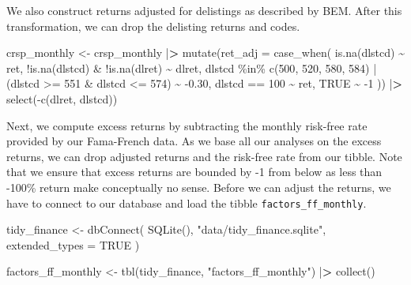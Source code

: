 \documentclass[
]{book}
\newenvironment{Shaded}{\begin{snugshade}}{\end{snugshade}}
\newcommand{\AttributeTok}[1]{\textcolor[rgb]{0.61,0.61,0.61}{#1}}
\newcommand{\ConstantTok}[1]{\textcolor[rgb]{0,0,0}{#1}}
\newcommand{\DecValTok}[1]{\textcolor[rgb]{0.06,0.06,0.06}{#1}}
\newcommand{\ErrorTok}[1]{\textcolor[rgb]{0.14,0.14,0.14}{\textbf{#1}}}
\newcommand{\FloatTok}[1]{\textcolor[rgb]{0.06,0.06,0.06}{#1}}
\newcommand{\FunctionTok}[1]{\textcolor[rgb]{0,0,0}{#1}}
\newcommand{\NormalTok}[1]{#1}
\newcommand{\OtherTok}[1]{\textcolor[rgb]{0.37,0.37,0.37}{#1}}
\newcommand{\SpecialCharTok}[1]{\textcolor[rgb]{0,0,0}{#1}}
\newcommand{\StringTok}[1]{\textcolor[rgb]{0.5,0.5,0.5}{#1}}
\begin{document}
We also construct returns adjusted for delistings as described by BEM. After this transformation, we can drop the delisting returns and codes.

\begin{Shaded}
\begin{Highlighting}[]
\NormalTok{crsp\_monthly }\OtherTok{\textless{}{-}}\NormalTok{ crsp\_monthly }\SpecialCharTok{|}\ErrorTok{\textgreater{}}
  \FunctionTok{mutate}\NormalTok{(}\AttributeTok{ret\_adj =} \FunctionTok{case\_when}\NormalTok{(}
    \FunctionTok{is.na}\NormalTok{(dlstcd) }\SpecialCharTok{\textasciitilde{}}\NormalTok{ ret,}
    \SpecialCharTok{!}\FunctionTok{is.na}\NormalTok{(dlstcd) }\SpecialCharTok{\&} \SpecialCharTok{!}\FunctionTok{is.na}\NormalTok{(dlret) }\SpecialCharTok{\textasciitilde{}}\NormalTok{ dlret,}
\NormalTok{    dlstcd }\SpecialCharTok{\%in\%} \FunctionTok{c}\NormalTok{(}\DecValTok{500}\NormalTok{, }\DecValTok{520}\NormalTok{, }\DecValTok{580}\NormalTok{, }\DecValTok{584}\NormalTok{) }\SpecialCharTok{|}
\NormalTok{      (dlstcd }\SpecialCharTok{\textgreater{}=} \DecValTok{551} \SpecialCharTok{\&}\NormalTok{ dlstcd }\SpecialCharTok{\textless{}=} \DecValTok{574}\NormalTok{) }\SpecialCharTok{\textasciitilde{}} \SpecialCharTok{{-}}\FloatTok{0.30}\NormalTok{,}
\NormalTok{    dlstcd }\SpecialCharTok{==} \DecValTok{100} \SpecialCharTok{\textasciitilde{}}\NormalTok{ ret,}
    \ConstantTok{TRUE} \SpecialCharTok{\textasciitilde{}} \SpecialCharTok{{-}}\DecValTok{1}
\NormalTok{  )) }\SpecialCharTok{|}\ErrorTok{\textgreater{}}
  \FunctionTok{select}\NormalTok{(}\SpecialCharTok{{-}}\FunctionTok{c}\NormalTok{(dlret, dlstcd))}
\end{Highlighting}
\end{Shaded}

Next, we compute excess returns by subtracting the monthly risk-free rate provided by our Fama-French data. As we base all our analyses on the excess returns, we can drop adjusted returns and the risk-free rate from our tibble. Note that we ensure that excess returns are bounded by -1 from below as less than -100\% return make conceptually no sense. Before we can adjust the returns, we have to connect to our database and load the tibble \texttt{factors\_ff\_monthly}.

\begin{Shaded}
\begin{Highlighting}[]
\NormalTok{tidy\_finance }\OtherTok{\textless{}{-}} \FunctionTok{dbConnect}\NormalTok{(}
  \FunctionTok{SQLite}\NormalTok{(), }\StringTok{"data/tidy\_finance.sqlite"}\NormalTok{, }\AttributeTok{extended\_types =} \ConstantTok{TRUE}
\NormalTok{)}

\NormalTok{factors\_ff\_monthly }\OtherTok{\textless{}{-}} \FunctionTok{tbl}\NormalTok{(tidy\_finance, }\StringTok{"factors\_ff\_monthly"}\NormalTok{) }\SpecialCharTok{|}\ErrorTok{\textgreater{}}
  \FunctionTok{collect}\NormalTok{()}
\end{Highlighting}
\end{Shaded}
\end{document}
